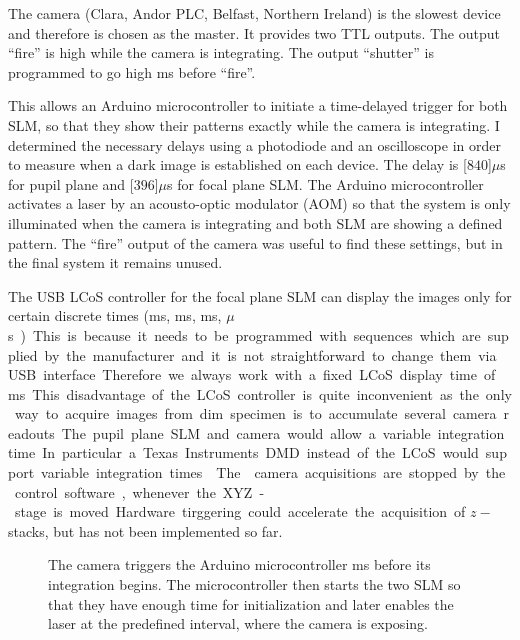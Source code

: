 The camera (Clara, Andor PLC, Belfast, Northern Ireland) is the
 slowest device and therefore is chosen as the
master. It provides two TTL outputs. The output ``fire'' is high while
the camera is integrating. The output ``shutter'' is programmed to go
high \unit[1]{ms} before ``fire''.

This allows an Arduino microcontroller to initiate a time-delayed
trigger for both SLM, so that they show their patterns exactly while
the camera is integrating. I determined the necessary delays using a
photodiode and an oscilloscope in order to measure when a dark image
is established on each device. The delay is \unit[$840$]{$\mu$s} for
pupil plane and \unit[$396$]{$\mu$s} for focal plane SLM. The Arduino
microcontroller activates a laser by an acousto-optic modulator (AOM)
so that the system is only illuminated when the camera is integrating
and both SLM are showing a defined pattern.  The ``fire'' output of
the camera was useful to find these settings, but in the final system
it remains unused.



The  USB LCoS controller for the
focal plane SLM can display the images only for certain discrete times
(\unit[20]{ms}, \unit[10]{ms}, \unit[5]{ms}, \unit[200]{$\mu$s}).
This is because it needs to be programmed with sequences which are
supplied by the manufacturer and it is not straightforward to change
them via USB interface. Therefore we always work with a fixed LCoS
display time of \unit[20]{ms}.

This disadvantage of the LCoS controller is quite inconvenient as the
only way to acquire images from dim specimen is to accumulate several
camera readouts.  The pupil plane SLM and camera would allow a
variable integration time. In particular a Texas Instruments DMD
instead of the LCoS would support variable integration times
\citep{Guide2012}.

The  camera acquisitions are stopped
by the control software, whenever the XYZ-stage is moved. Hardware
tirggering could accelerate the acquisition of $z-$stacks, but has not
been implemented so far.

\begin{figure}[H]
 \centering
 \caption{The camera triggers the Arduino microcontroller \unit[1]{ms}
   before its integration begins. The microcontroller then starts the
   two SLM so that they have enough time for initialization and later
   enables the laser at the predefined interval, where the camera is
   exposing.}
 \label{fig:memi-electronics}
\end{figure}






